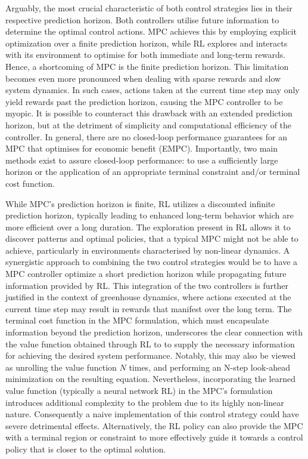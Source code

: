 Arguably, the most crucial characteristic of both control strategies lies in their respective prediction horizon. Both controllers utilise future information to determine the optimal control actions. MPC achieves this by employing explicit optimization over a finite prediction horizon, while RL explores and interacts with its environment to optimise for both immediate and long-term rewards.
Hence, a shortcoming of MPC is the finite prediction horizon. This limitation becomes even more pronounced when dealing with sparse rewards and slow system dynamics. In such cases, actions taken at the current time step may only yield rewards past the prediction horizon, causing the MPC controller to be myopic. It is possible to counteract this drawback with an extended prediction horizon, but at the detriment of simplicity and computational efficiency of the controller. In general, there are no closed-loop performance guarantees for an MPC that optimises for economic benefit (EMPC). Importantly, two main methods exist to assure closed-loop performance: to use a sufficiently large horizon or the application of an appropriate terminal constraint and/or terminal cost function.

While MPC's prediction horizon is finite, RL utilizes a discounted infinite prediction horizon, typically leading to enhanced long-term behavior which are more efficient over a long duration. The exploration present in RL allows it to discover patterns and optimal policies, that a typical MPC might not be able to achieve, particularly in environments characterised by non-linear dynamics. A synergistic approach to combining the two control strategies would be to have a MPC controller optimize a short prediction horizon while propagating future information provided by RL. This integration of the two controllers is further justified in the context of greenhouse dynamics, where actions executed at the current time step may result in rewards that manifest over the long term. The terminal  cost function in the MPC formulation, which must encapsulate information beyond the prediction horizon, underscores the clear connection with the value function obtained through RL to to supply the necessary information for achieving the desired system performance. Notably, this may also be viewed as unrolling the value function $N$ times, and performing an N-step look-ahead minimization on the resulting equation. Nevertheless, incorporating the learned value function (typically a neural network RL) in the MPC's formulation introduces additional complexity to the problem due to its highly non-linear nature. Consequently a naive implementation of this control strategy could have severe detrimental effects. Alternatively, the RL policy can also provide the MPC with a terminal region or constraint to more effectively guide it towards a control policy that is closer to the optimal solution.

